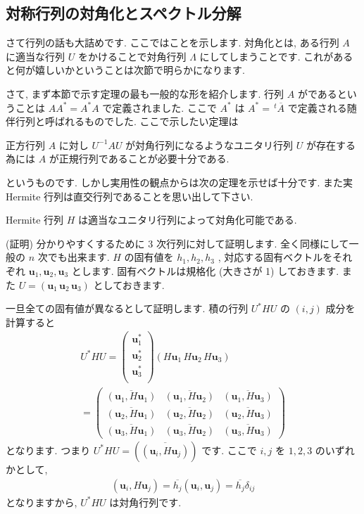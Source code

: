\documentclass[openany, a4paper, oneside]{jsbook}
\begin{document}
\subsection{対称行列の対角化とスペクトル分解\label{taikakuka}}

さて行列の話も大詰めです. ここではことを示します.
対角化とは, ある行列 $A$ に適当な行列 $U$ をかけることで対角行列 $\Lambda$ にしてしまうことです.
これがあると何が嬉しいかということは次節で明らかになります.

さて, まず本節で示す定理の最も一般的な形を紹介します.
行列 $A$ がであるということは $AA^{*} = A^{*}A$ で定義されました.
ここで $A^{*}$ は $A^{*} = \,^{t}\overline{A}$ で定義される随伴行列と呼ばれるものでした.
ここで示したい定理は
\begin{thm}
 正方行列 $A$ に対し $U^{-1}AU$ が対角行列になるようなユニタリ行列 $U$ が存在する為には
 $A$ が正規行列であることが必要十分である.
\end{thm}
というものです.
しかし実用性の観点からは次の定理を示せば十分です.
また実 Hermite 行列は直交行列であることを思い出して下さい.
\begin{thm}
Hermite 行列 $H$ は適当なユニタリ行列によって対角化可能である.
\end{thm}
(証明)
分かりやすくするために 3 次行列に対して証明します. 全く同様にして一般の $n$ 次でも出来ます.
$H$ の固有値を $h_1,h_2,h_3$ , 対応する固有ベクトルをそれぞれ $\bm{u}_1,\bm{u}_2,\bm{u}_3$ とします.
固有ベクトルは規格化 (大きさが 1) しておきます.
また $U = ( \bm{u}_1 \, \bm{u}_2 \, \bm{u}_3 )$ としておきます.

一旦全ての固有値が異なるとして証明します.
積の行列 $U^* H U$ の $(i,j)$ 成分を計算すると
\begin{gather}
    U^* H U
    =
    \begin{pmatrix}
        \bm{u}_1^* \\
        \bm{u}_2^* \\
        \bm{u}_3^* \\
    \end{pmatrix}
    ( H \bm{u}_1 \, H \bm{u}_2 \, H \bm{u}_3 ) \\
    =
    \begin{pmatrix}
        \overline{ (\bm{u}_1 , H \bm{u}_1 ) } & \overline{ (\bm{u}_1 , H \bm{u}_2 ) } & \overline{ (\bm{u}_1 , H \bm{u}_3 ) } \\
        \overline{ (\bm{u}_2 , H \bm{u}_1 ) } & \overline{ (\bm{u}_2 , H \bm{u}_2 ) } & \overline{ (\bm{u}_2 , H \bm{u}_3 ) } \\
        \overline{ (\bm{u}_3 , H \bm{u}_1 ) } & \overline{ (\bm{u}_3 , H \bm{u}_2 ) } & \overline{ (\bm{u}_3 , H \bm{u}_3 ) }
    \end{pmatrix}
\end{gather}
となります. つまり $U^* H U = \left ( \overline{ \left ( \bm{u}_i , H \bm{u}_j \right) } \right)$ です.
ここで $i,j$ を $1,2,3$ のいずれかとして,
\begin{align}
    ( \bm{u}_i , H \bm{u}_j )
    =
    \overline{h_j} ( \bm{u}_i , \bm{u}_j )
    =
    \overline{h_j} \delta _{ij}
\end{align}
となりますから,  $U^* H U$ は対角行列です.
\end{document}
